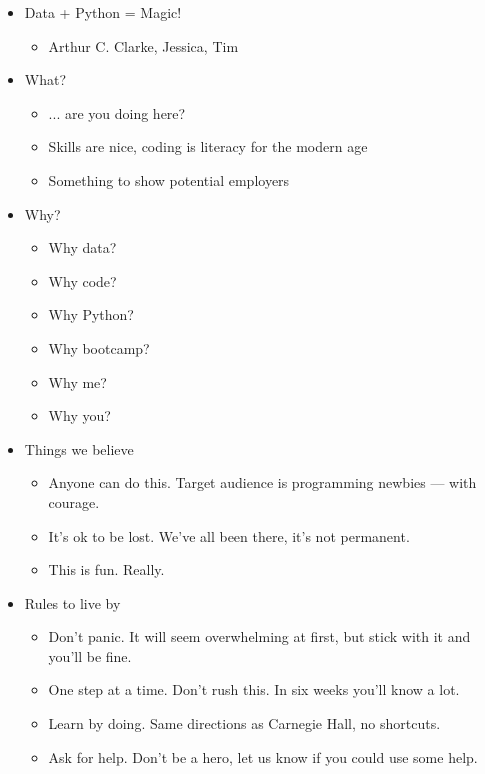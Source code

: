 \begin{itemize}
\item Data + Python = Magic!
\begin{itemize}
\item Arthur C. Clarke, Jessica, Tim
\end{itemize}

\item What?
\begin{itemize}
\item ... are you doing here?
\item Skills are nice, coding is literacy for the modern age
\item Something to show potential employers
\end{itemize}

\item Why?
\begin{itemize}
\item Why data?
\item Why code?
\item Why Python?
\item Why bootcamp?
\item Why me?
\item Why you?
\end{itemize}

\item Things we believe
\begin{itemize}
\item Anyone can do this.  Target audience is {programming newbies --- with courage}.
\item It's ok to be lost.  We've all been there, it's not permanent.
\item This is fun.  Really.
\end{itemize}


\item Rules to live by
\begin{itemize}
\item Don't panic.  It will seem overwhelming at first, but stick with it and you'll be fine.
\item One step at a time.  Don't rush this.  In six weeks you'll know a lot.
\item Learn by doing.  Same directions as Carnegie Hall, no shortcuts.
\item Ask for help.  Don't be a hero, let us know if you could use some help.
\end{itemize}


\end{itemize}
